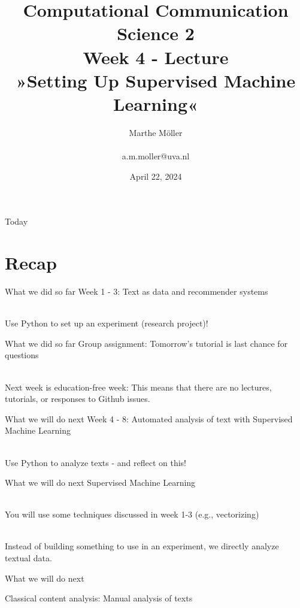 \documentclass[compress]{beamer}
\title[Computational Communication Science 2]{\textbf{Computational Communication Science 2} \\Week 4 - Lecture\\ »Setting Up Supervised Machine Learning«}
\author[A. Marthe Möller]{Marthe Möller \\ ~ \\ \footnotesize{a.m.moller@uva.nl} \\}
\date{April 22, 2024}
\institute[Digital Society Minor, University of Amsterdam]{Digital Society Minor, University of Amsterdam}
\begin{document}
	
\begin{frame}{}
	\titlepage
\end{frame}
	
\begin{frame}{Today}
	\begin{tiny}
	\tableofcontents
	\end{tiny}
\end{frame}


\section{Recap}

\begin{frame}[fragile]{What we did so far}
Week 1 - 3: Text as data and recommender systems \\\

Use Python to set up an experiment (research project)!
\end{frame}

\begin{frame}[fragile]{What we did so far}
Group assignment: Tomorrow's tutorial is last chance for questions \\\

Next week is education-free week: This means that there are no lectures, tutorials, or responses to Github issues.
\end{frame}

\begin{frame}[fragile]{What we will do next}
Week 4 - 8: Automated analysis of text with Supervised Machine Learning \\\
	
Use Python to analyze texts - and reflect on this!
\end{frame}

\begin{frame}[fragile]{What we will do next}
Supervised Machine Learning \\\

You will use some techniques discussed in week 1-3 (e.g., vectorizing) \\\

Instead of building something to use in an experiment, we directly analyze textual data.
\end{frame}


\begin{frame}[fragile]{What we will do next} 
	
Classical content analysis:	
Manual analysis of texts
\end{frame}
\end{document}
